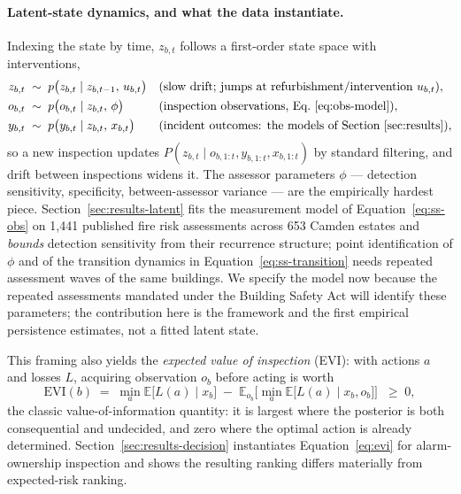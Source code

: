 \paragraph{Latent-state dynamics, and what the data instantiate.} Indexing the
state by time, $z_{b,t}$ follows a first-order state space with interventions,
\begin{align}
  z_{b,t} &\;\sim\; p\big(z_{b,t} \mid z_{b,t-1},\, u_{b,t}\big)
  &&\text{(slow drift; jumps at refurbishment/intervention $u_{b,t}$)},
  \label{eq:ss-transition}\\
  o_{b,t} &\;\sim\; p\big(o_{b,t} \mid z_{b,t},\, \phi\big)
  &&\text{(inspection observations, Eq.~\eqref{eq:obs-model})},
  \label{eq:ss-obs}\\
  y_{b,t} &\;\sim\; p\big(y_{b,t} \mid z_{b,t},\, x_{b,t}\big)
  &&\text{(incident outcomes: the models of Section~\ref{sec:results})},
  \label{eq:ss-outcome}
\end{align}
so a new inspection updates $P(z_{b,t}\mid o_{b,1:t}, y_{b,1:t}, x_{b,1:t})$ by
standard filtering, and drift between inspections widens it. The assessor
parameters $\phi$ --- detection sensitivity, specificity, between-assessor
variance --- are the empirically hardest piece. Section~\ref{sec:results-latent}
fits the measurement model of Equation~\eqref{eq:ss-obs} on 1{,}441 published fire
risk assessments across 653 Camden estates and \emph{bounds} detection sensitivity
from their recurrence structure; point identification of $\phi$ and of the
transition dynamics in Equation~\eqref{eq:ss-transition} needs repeated assessment
waves of the same buildings. We specify the model now because the repeated
assessments mandated under the Building Safety Act will identify these parameters;
the contribution here is the framework and the first empirical persistence
estimates, not a fitted latent state.

This framing also yields the \emph{expected value of inspection} (EVI): with actions
$a$ and losses $L$, acquiring observation $o_b$ before acting is worth
\begin{equation}
  \mathrm{EVI}(b) \;=\;
  \min_a \mathbb{E}\!\big[L(a) \mid x_b\big]
  \;-\;
  \mathbb{E}_{o_b}\!\Big[\min_a \mathbb{E}\!\big[L(a) \mid x_b, o_b\big]\Big]
  \;\;\geq\; 0,
  \label{eq:evi}
\end{equation}
the classic value-of-information quantity: it is largest where the posterior is
both consequential and undecided, and zero where the optimal action is already
determined. Section~\ref{sec:results-decision} instantiates
Equation~\eqref{eq:evi} for alarm-ownership inspection and shows the resulting
ranking differs materially from expected-risk ranking.

